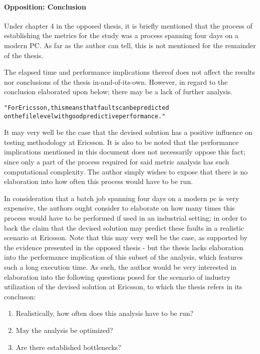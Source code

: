 
\paragraph{Opposition: Conclusion}
\label{par:oppositionconclusion}
Under chapter 4 in the opposed thesis, it is briefly mentioned that the process of establishing the metrics for the study was a process spanning four days on a modern PC.
As far as the author can tell, this is not mentioned for the remainder of the thesis.

The elapsed time and performance implications thereof does not affect the results nor conclusions of the thesis in-and-of-its-own.
However, in regard to the conclusion elaborated upon below; there may be a lack of further analysis.

\begin{alltt}
"For Ericsson, this means that faults can be predicted
on the file level with good predictive performance."
\end{alltt}

It may very well be the case that the devised solution has a positive influence on testing methodology at Ericsson.
It is also to be noted that the performance implications mentioned in this document does not necessarily oppose this fact; since only a part of the process required for said metric analysis has such computational complexity.
The author simply wishes to expose that there is no elaboration into how often this process would have to be run.

In consideration that a batch job spanning four days on a modern pc is very expensive, the authors ought consider to elaborate on how many times this process would have to be performed if used in an industrial setting; in order to back the claim that the devised solution may predict these faults in a realistic scenario at Ericsson.
Note that this may very well be the case, as supported by the evidence presented in the opposed thesis - but the thesis lacks elaboration into the performance implication of this subset of the analysis, which features such a long execution time.
As such, the author would be very interested in elaboration into the following questions posed for the scenario of industry utilization of the devised solution at Ericsson, to which the thesis refers in its concluson:

\begin{enumerate}
	\item Realistically, how often does this analysis have to be run?
	\item May the analysis be optimized?
	\item Are there established bottlenecks?
\end{enumerate}